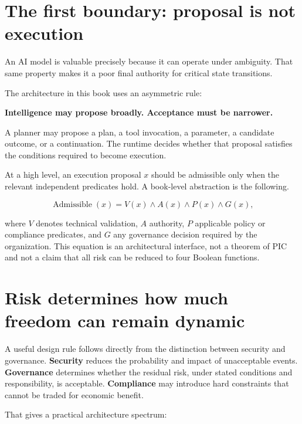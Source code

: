 \documentclass[10pt,oneside,openany]{book}
\newcommand{\term}[1]{\textbf{#1}}
\begin{document}
\section{The first boundary: proposal is not execution}

An AI model is valuable precisely because it can operate under ambiguity. That same property makes it a poor final authority for critical state transitions.

The architecture in this book uses an asymmetric rule:

\begin{center}
\sffamily\bfseries
Intelligence may propose broadly. Acceptance must be narrower.
\end{center}

A planner may propose a plan, a tool invocation, a parameter, a candidate outcome, or a continuation. The runtime decides whether that proposal satisfies the conditions required to become execution.

At a high level, an execution proposal $x$ should be admissible only when the relevant independent predicates hold. A book-level abstraction is the following.
\begin{formulabox}
\[
\operatorname{Admissible}(x)
=
V(x)\land A(x)\land P(x)\land G(x),
\]
\end{formulabox}
where $V$ denotes technical validation, $A$ authority, $P$ applicable policy or compliance predicates, and $G$ any governance decision required by the organization. This equation is an architectural interface, not a theorem of PIC and not a claim that all risk can be reduced to four Boolean functions.

\section{Risk determines how much freedom can remain dynamic}

A useful design rule follows directly from the distinction between security and governance. \term{Security} reduces the probability and impact of unacceptable events. \term{Governance} determines whether the residual risk, under stated conditions and responsibility, is acceptable. \term{Compliance} may introduce hard constraints that cannot be traded for economic benefit.

That gives a practical architecture spectrum:
\end{document}
